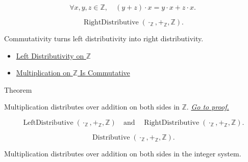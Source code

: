 \begin{remark*}
\[
\forall x,y,z\in\mathbb{Z},\quad
(y+z)\cdot x=y\cdot x+z\cdot x.
\]
\end{remark*}

\begin{remark*}
\[
\operatorname{RightDistributive}(\cdot_{\mathbb{Z}},+_{\mathbb{Z}},\mathbb{Z}).
\]
\end{remark*}

\begin{remark*}[Interpretation]
Commutativity turns left distributivity into right distributivity.
\end{remark*}

\begin{dependencies}
\begin{itemize}
  \item \hyperref[thm:left-distributivity-on-z]{Left Distributivity on $\mathbb{Z}$}
  \item \hyperref[thm:multiplication-on-z-commutative]{Multiplication on $\mathbb{Z}$ Is Commutative}
\end{itemize}
\end{dependencies}

\begin{theorembox}{Theorem}
\begin{theorem}
\label{thm:multiplication-distributes-over-addition-on-z}
Multiplication distributes over addition on both sides in $\mathbb{Z}$.
\hyperref[prf:multiplication-distributes-over-addition-on-z]{\textit{Go to proof.}}
\end{theorem}
\end{theorembox}

\begin{remark*}
\[
\operatorname{LeftDistributive}(\cdot_{\mathbb{Z}},+_{\mathbb{Z}},\mathbb{Z})
\quad\text{and}\quad
\operatorname{RightDistributive}(\cdot_{\mathbb{Z}},+_{\mathbb{Z}},\mathbb{Z}).
\]
\end{remark*}

\begin{remark*}
\[
\operatorname{Distributive}(\cdot_{\mathbb{Z}},+_{\mathbb{Z}},\mathbb{Z}).
\]
\end{remark*}

\begin{remark*}[Interpretation]
Multiplication distributes over addition on both sides in the integer system.
\end{remark*}

